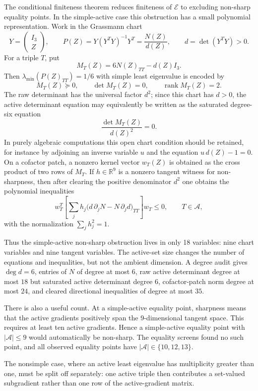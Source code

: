 \documentclass[11pt]{article}
\numberwithin{equation}{section}
\theoremstyle{definition}
\newcommand{\R}{\mathbb{R}}
\newcommand{\rank}{\operatorname{rank}}
\newcommand{\cE}{\mathcal E}
\newcommand{\cA}{\mathcal A}
\begin{document}
The conditional finiteness theorem reduces finiteness of $\cE$ to excluding
non-sharp equality points.  In the simple-active case this obstruction has a
small polynomial representation.  Work in the Grassmann chart
\[
  Y=\begin{pmatrix}I_3\\ Z\end{pmatrix},\qquad
  P(Z)=Y(Y^TY)^{-1}Y^T=\frac{N(Z)}{d(Z)},\qquad d=\det(Y^TY)>0.
\]
For a triple $T$, put
\[
  M_T(Z)=6N(Z)_{TT}-d(Z)I_3.
\]
Then $\lambda_{\min}(P(Z)_{TT})=1/6$ with simple least eigenvalue is encoded by
\[
  M_T(Z)\succeq0,\qquad \det M_T(Z)=0,\qquad \rank M_T(Z)=2.
\]
The raw determinant has the universal factor $d^2$; since this chart has
$d>0$, the active determinant equation may equivalently be written as the
saturated degree-six equation
\[
  \frac{\det M_T(Z)}{d(Z)^2}=0.
\]
In purely algebraic computations this open chart condition should be retained,
for instance by adjoining an inverse variable $u$ and the equation
$u\,d(Z)-1=0$.
On a cofactor patch, a nonzero kernel vector $w_T(Z)$ is obtained as the cross
product of two rows of $M_T$.  If $h\in\R^9$ is a nonzero tangent witness for
non-sharpness, then after clearing the positive denominator $d^2$ one obtains the
polynomial inequalities
\[
  w_T^T\left[
  \sum_j h_j\bigl(d\,\partial_jN-N\,\partial_jd\bigr)_{TT}
  \right]w_T\le0,\qquad T\in\cA,
\]
with the normalization $\sum_jh_j^2=1$.

Thus the simple-active non-sharp obstruction lives in only 18 variables: nine
chart variables and nine tangent variables.  The active-set size changes the
number of equations and inequalities, but not the ambient dimension.  A degree
audit gives $\deg d=6$, entries of $N$ of degree at most $6$, raw active
determinant degree at most $18$ but saturated active determinant degree $6$,
cofactor-patch norm degree at most $24$, and cleared directional inequalities
of degree at most $35$.

There is also a useful count.  At a simple-active equality point, sharpness means
that the active gradients positively span the 9-dimensional tangent space.  This
requires at least ten active gradients.  Hence a simple-active equality point
with $|\cA|\le9$ would automatically be non-sharp.  The equality screens found no
such point, and all observed equality points have $|\cA|\in\{10,12,13\}$.

The nonsimple case, where an active least eigenvalue has multiplicity greater
than one, must be split off separately: one active triple then contributes a
set-valued subgradient rather than one row of the active-gradient matrix.
\end{document}
